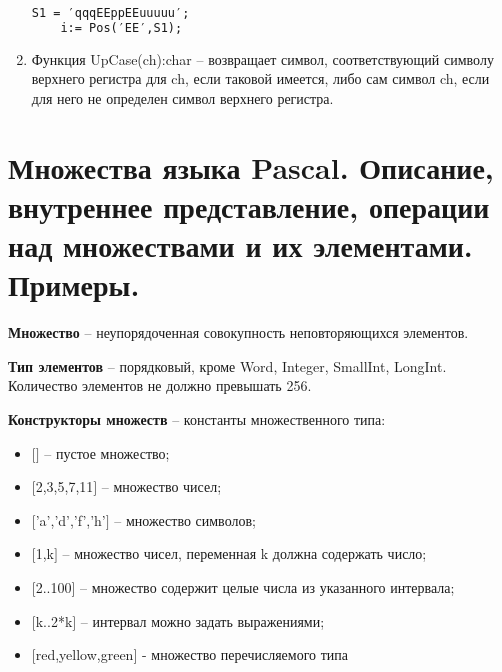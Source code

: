 \begin{enumerate}
\begin{lstlisting}[language=Pascal]
	S1 = ′qqqEEррEEuuuuu′;
 	i:= Pos(′EE′,S1);     
\end{lstlisting} 

\item Функция UpCase(ch):char – возвращает символ, соответствующий символу верхнего регистра для ch, если таковой имеется, либо сам символ ch, если для него не определен символ верхнего регистра.

\end{enumerate}





\newpage\section{Множества  языка  Pascal.  Описание,  внутреннее  представление,  операции  над  множествами и их элементами. Примеры. }

\begin{myquote}
            
\end{myquote}

{\bf{Множество}} – неупорядоченная совокупность неповторяющихся элементов.

{\bf{Тип элементов}} – порядковый, кроме Word, Integer, SmallInt, LongInt. Количество элементов не должно превышать 256.

{\bf{Конструкторы множеств}} – константы множественного типа:
\begin{itemize}

\item $[$$]$ – пустое множество;
\item $[$2,3,5,7,11$]$ – множество чисел;
\item $[$’a’,’d’,’f’,’h’$]$ – множество символов;
\item $[$1,k$]$ – множество чисел, переменная k должна содержать число;
\item $[$2..100$]$ – множество содержит целые числа из указанного интервала;
\item $[$k..2*k$]$ – интервал можно задать выражениями;
\item $[$red,yellow,green$]$ - множество перечисляемого типа

\end{itemize}

